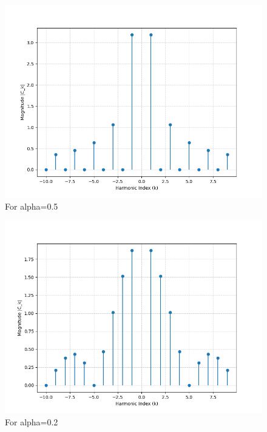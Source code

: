 \begin{multicols}{2}
\begin{figure}[H]
  \centering
  \includegraphics[width=\columnwidth]{sections/1_spectrum.png}
  \caption{For alpha=0.5}
\end{figure}
\begin{figure}[H]
  \centering
  \includegraphics[width=\columnwidth]{sections/1_spectrum2.png}
  \caption{For alpha=0.2}
\end{figure}
\begin{figure}[H]
  \centering

\end{figure}
\end{multicols}
